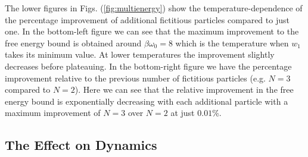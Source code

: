 The lower figures in Figs. (\ref{fig:multienergy}) show the temperature-dependence
of the percentage improvement of additional fictitious particles compared to just one. In the bottom-left figure we can see that the maximum improvement to the free energy bound is obtained around $\beta \omega_0 = 8$ which is the temperature when $w_1$ takes its minimum value. At lower temperatures the improvement slightly decreases before plateauing. In the bottom-right figure we have the percentage improvement relative to the previous number of fictitious particles (e.g. $N = 3$ compared to $N = 2$). Here we can see that the relative improvement in the free energy bound is exponentially decreasing with each additional particle with a maximum improvement of $N=3$ over $N=2$ at just $0.01$\%.

\subsection{The Effect on Dynamics}


